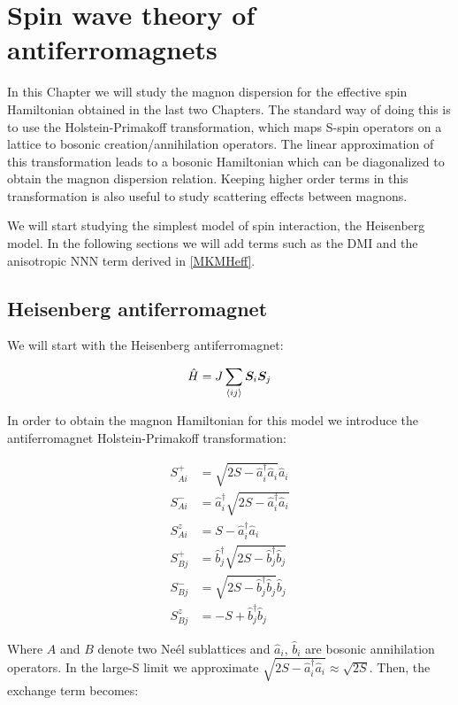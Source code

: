\chapter{Spin wave theory of antiferromagnets}
\label{SpinWave}

In this Chapter we will study the magnon dispersion for the effective spin Hamiltonian obtained in the last two Chapters. The standard way of doing this is to use the Holstein-Primakoff transformation, which maps S-spin operators on a lattice to bosonic creation/annihilation operators. The linear approximation of this transformation leads to a bosonic Hamiltonian which can be diagonalized to obtain the magnon dispersion relation. Keeping higher order terms in this transformation is also useful to study scattering effects between magnons.

We will start studying the simplest model of spin interaction, the Heisenberg model. In the following sections we will add terms such as the DMI and the anisotropic NNN term derived in \ref{MKMHeff}.

\section{Heisenberg antiferromagnet}

We will start with the Heisenberg antiferromagnet:

\begin{equation}
\label{Heisenberg}
\hat{H} = J \sum_{\langle i j \rangle} \boldsymbol{S}_i \boldsymbol{S}_j
\end{equation}

In order to obtain the magnon Hamiltonian for this model we introduce the antiferromagnet Holstein-Primakoff transformation:

\begin{align}
S^+_{Ai} &= \sqrt{2S-\hat{a}^\dagger_i \hat{a}_i} \hat{a}_i \\
S^-_{Ai} &= \hat{a}^\dagger_i\sqrt{2S-\hat{a}^\dagger_i \hat{a}_i}  \\
S^z_{Ai} &= S - \hat{a}^\dagger_i \hat{a}_i \\
S^+_{Bj} &=\hat{b}^\dagger_j\sqrt{2S-\hat{b}^\dagger_j \hat{b}_j} \\
S^-_{Bj} &= \sqrt{2S-\hat{b}^\dagger_j \hat{b}_j} \hat{b}_j \\
S^z_{Bj} &= -S + \hat{b}^\dagger_j \hat{b}_j
\end{align}

Where $A$ and $B$ denote two Ne\'{e}l sublattices and $\hat{a}_i$, $\hat{b}_i$ are bosonic annihilation operators. In the large-S limit we approximate $ \sqrt{2S-\hat{a}^\dagger_i \hat{a}_i} \approx \sqrt{2S}$. Then, the exchange term becomes:

